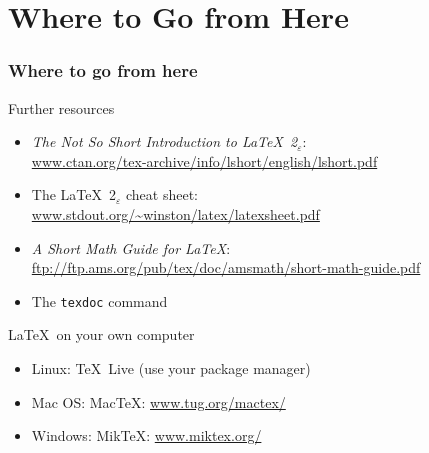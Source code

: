 \documentclass[ignorenonframetext]{beamer}
\begin{document}
\section{Where to Go from Here}
\begin{frame}
  \frametitle{Where to go from here}
  {\small
  \begin{block}{Further resources}
    \begin{itemize}
    \item \emph{The Not So Short Introduction to \LaTeX\ 2}$_\varepsilon$:\\
      \url{www.ctan.org/tex-archive/info/lshort/english/lshort.pdf}
    \item The \LaTeX\ 2$_\varepsilon$ cheat sheet:\\
      \url{www.stdout.org/~winston/latex/latexsheet.pdf}
    \item \emph{A Short Math Guide for \LaTeX}:\\
      \url{ftp://ftp.ams.org/pub/tex/doc/amsmath/short-math-guide.pdf}
    \item The \texttt{texdoc} command
    \end{itemize}
  \end{block}
  }
  \begin{block}{\LaTeX\ on your own computer}
    \begin{itemize}
    \item Linux: \TeX\ Live (use your package manager)
    \item Mac OS: Mac\TeX: \url{www.tug.org/mactex/}
    \item Windows: Mik\TeX: \url{www.miktex.org/}
    \end{itemize}
  \end{block}
\end{frame}
\end{document}

